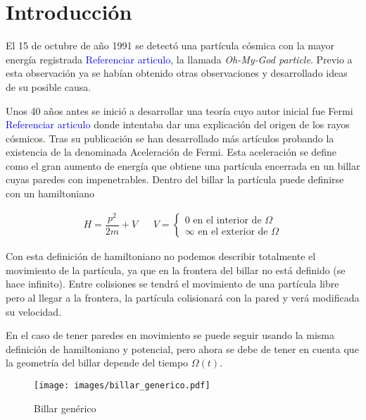 %
%

\chapter{Introducción}

El 15 de octubre de año 1991 se detectó una partícula cósmica con la mayor energía registrada \textcolor{blue}{Referenciar articulo}, la llamada \textit{Oh-My-God particle}\cite{OhMyParticle}. Previo a esta observación ya se habían obtenido otras observaciones y desarrollado ideas de su posible causa.

\vspace{3mm}

Unos 40 años antes se inició a desarrollar una teoría cuyo autor inicial fue Fermi \cite{Fermi} \textcolor{blue}{Referenciar articulo} donde intentaba dar una explicación del origen de los rayos cósmicos. Tras su publicación se han desarrollado más artículos probando la existencia de la denominada Aceleración de Fermi. Esta aceleración se define como el gran aumento de energía que obtiene una partícula encerrada en un billar cuyas paredes con impenetrables. Dentro del billar la partícula puede definirse con un hamiltoniano

\begin{align}
    H = \dfrac{p^2}{2m} + V & & V = \begin{cases}
        0 \text{ en el interior de } \Omega \\
        \infty \text{ en el exterior de } \Omega
    \end{cases}
\end{align}

\vspace{3mm}

Con esta definición de hamiltoniano no podemos describir totalmente el movimiento de la partícula, ya que en la frontera del billar no está definido (se hace infinito). Entre colisiones se tendrá el movimiento de una partícula libre pero al llegar a la frontera, la partícula colisionará con la pared y verá modificada su velocidad. 

\vspace{3mm}

En el caso de tener paredes en movimiento se puede seguir usando la misma definición de hamiltoniano y potencial, pero ahora se debe de tener en cuenta que la geometría del billar depende del tiempo \( \Omega(t) \).

\begin{figure}[H]
    \centering
    \texttt{[image: images/billar\_generico.pdf]}
    \caption{Billar genérico}
    \label{fig:bilar_generico}
\end{figure}


